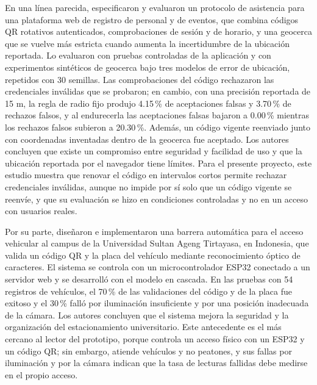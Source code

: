 En una línea parecida, \textcite{amoanu2026rotatingqr} especificaron y
evaluaron un protocolo de asistencia para una plataforma web de registro de
personal y de eventos, que combina códigos QR rotativos autenticados,
comprobaciones de sesión y de horario, y una geocerca que se vuelve más
estricta cuando aumenta la incertidumbre de la ubicación reportada. Lo
evaluaron con pruebas controladas de la aplicación y con experimentos
sintéticos de geocerca bajo tres modelos de error de ubicación, repetidos con
30 semillas. Las comprobaciones del código rechazaron las credenciales
inválidas que se probaron; en cambio, con una precisión reportada de 15 m, la
regla de radio fijo produjo 4.15\,\% de aceptaciones falsas y 3.70\,\% de
rechazos falsos, y al endurecerla las aceptaciones falsas bajaron a 0.00\,\%
mientras los rechazos falsos subieron a 20.30\,\%. Además, un código vigente
reenviado junto con coordenadas inventadas dentro de la geocerca fue aceptado.
Los autores concluyen que existe un compromiso entre seguridad y facilidad de
uso y que la ubicación reportada por el navegador tiene límites. Para el
presente proyecto, este estudio muestra que renovar el código en intervalos
cortos permite rechazar credenciales inválidas, aunque no impide por sí solo
que un código vigente se reenvíe, y que su evaluación se hizo en condiciones
controladas y no en un acceso con usuarios reales.

Por su parte, \textcite{henriana2026gate} diseñaron e implementaron una
barrera automática para el acceso vehicular al campus de la Universidad Sultan
Ageng Tirtayasa, en Indonesia, que valida un código QR y la placa del vehículo
mediante reconocimiento óptico de caracteres. El sistema se controla con un
microcontrolador ESP32 conectado a un servidor web y se desarrolló con el
modelo en cascada. En las pruebas con 54 registros de vehículos, el 70\,\% de
las validaciones del código y de la placa fue exitoso y el 30\,\% falló por
iluminación insuficiente y por una posición inadecuada de la cámara. Los
autores concluyen que el sistema mejora la seguridad y la organización del
estacionamiento universitario. Este antecedente es el más cercano al lector
del prototipo, porque controla un acceso físico con un ESP32 y un código QR;
sin embargo, atiende vehículos y no peatones, y sus fallas por iluminación y
por la cámara indican que la tasa de lecturas fallidas debe medirse en el
propio acceso.

